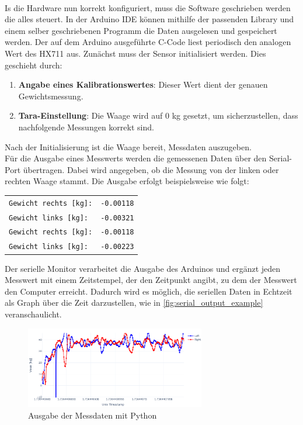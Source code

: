 \\
Is die Hardware nun korrekt konfiguriert, muss die Software geschrieben werden die alles steuert.
In der Arduino IDE können mithilfe der passenden Library und einem selber geschriebenen Programm die Daten ausgelesen und gespeichert werden.
Der auf dem Arduino ausgeführte C-Code liest periodisch den analogen Wert des HX711 aus.
Zunächst muss der Sensor initialisiert werden.
Dies geschieht durch:
\begin{enumerate}
    \item \textbf{Angabe eines Kalibrationswertes}: Dieser Wert dient der genauen Gewichtsmessung.
    \item \textbf{Tara-Einstellung}: Die Waage wird auf 0 kg gesetzt, um sicherzustellen, dass nachfolgende Messungen korrekt sind.
\end{enumerate}
Nach der Initialisierung ist die Waage bereit, Messdaten auszugeben.
\\
Für die Ausgabe eines Messwerts werden die gemessenen Daten über den Serial-Port übertragen.
Dabei wird angegeben, ob die Messung von der linken oder rechten Waage stammt.
Die Ausgabe erfolgt beispielsweise wie folgt:
\begin{center}
    \begin{tabular}{l r}
        \texttt{Gewicht rechts [kg]:} & \texttt{-0.00118} \\
        \texttt{Gewicht links [kg]:}  & \texttt{-0.00321} \\
        \texttt{Gewicht rechts [kg]:} & \texttt{-0.00118} \\
        \texttt{Gewicht links [kg]:}  & \texttt{-0.00223} \\
    \end{tabular}
\end{center}
Der serielle Monitor verarbeitet die Ausgabe des Arduinos und ergänzt jeden Messwert mit einem Zeitstempel, der den Zeitpunkt angibt, zu dem der Messwert den Computer erreicht.
Dadurch wird es möglich, die seriellen Daten in Echtzeit als Graph über die Zeit darzustellen, wie in \autoref{fig:serial_output_example} veranschaulicht.
\begin{figure}[h!]
    \centering
    \includegraphics[width=0.7\textwidth]{img/serial_output_example.png} %
    \caption{Ausgabe der Messdaten mit Python}
    \label{fig:serial_output_example}
\end{figure}
